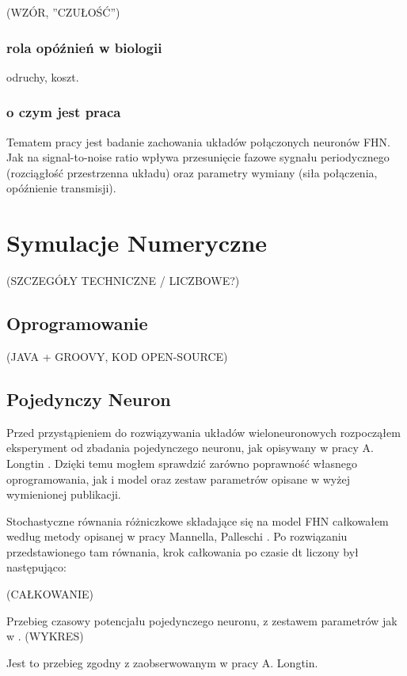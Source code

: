 \documentclass[12pt]{article}
\begin{document}
  (WZÓR, ''CZUŁOŚĆ'')

  \subsubsection{rola opóźnień w biologii}
  odruchy, koszt.
  
  \subsubsection{o czym jest praca}

  Tematem pracy jest badanie zachowania układów połączonych neuronów FHN. Jak na signal-to-noise ratio wpływa przesunięcie fazowe sygnału periodycznego (rozciągłość przestrzenna układu) oraz parametry wymiany (siła połączenia, opóźnienie transmisji).

    
  \section{Symulacje Numeryczne}
  
  (SZCZEGÓŁY TECHNICZNE / LICZBOWE?)
  
  
  \subsection{Oprogramowanie}
  
  (JAVA + GROOVY, KOD OPEN-SOURCE)
  
  \subsection{Pojedynczy Neuron}
  
  Przed przystąpieniem do rozwiązywania układów wieloneuronowych rozpocząłem eksperyment od zbadania pojedynczego neuronu, jak opisywany w pracy A. Longtin \cite{longtin}. Dzięki temu mogłem sprawdzić zarówno poprawność własnego oprogramowania, jak i model oraz zestaw parametrów opisane w wyżej wymienionej publikacji.
  
  Stochastyczne równania różniczkowe składające się na model FHN całkowałem według metody opisanej w pracy Mannella, Palleschi \cite{mannella}. Po rozwiązaniu przedstawionego tam równania, krok całkowania po czasie dt liczony był następująco:
  
  (CAŁKOWANIE)
  
  Przebieg czasowy potencjału pojedynczego neuronu, z zestawem parametrów jak w \cite{longtin}.
  (WYKRES)
  
  Jest to przebieg zgodny z zaobserwowanym w pracy A. Longtin.
  
\end{document}
